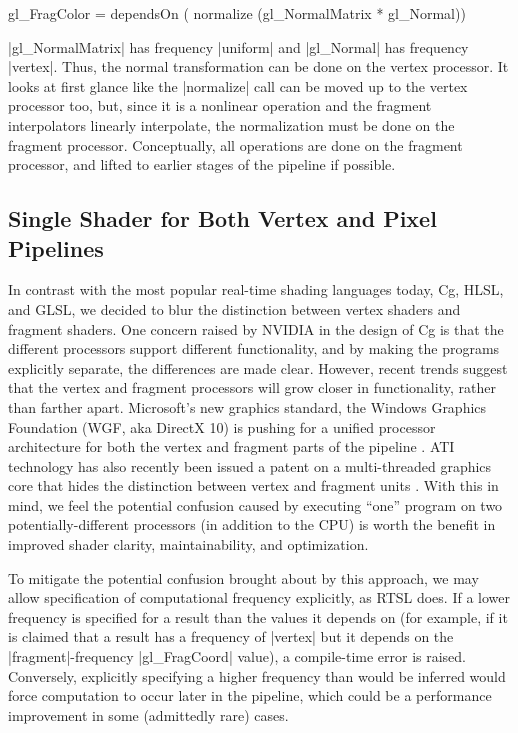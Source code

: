 \documentclass[review]{acmsiggraph}      %
\begin{document}
\begin{MyVerb}
gl_FragColor = dependsOn (
    normalize (gl_NormalMatrix * gl_Normal))
\end{MyVerb}

|gl_NormalMatrix| has frequency |uniform| and |gl_Normal| has
frequency |vertex|.  Thus, the normal transformation can be done on
the vertex processor.  It looks at first glance like the |normalize|
call can be moved up to the vertex processor too, but, since it is a
nonlinear operation and the fragment interpolators linearly
interpolate, the normalization must be done on the fragment processor.
Conceptually, all operations are done on the fragment processor, and
lifted to earlier stages of the pipeline if possible.


\subsection{Single Shader for Both Vertex and Pixel Pipelines}

In contrast with the most popular real-time shading languages today,
Cg, HLSL, and GLSL, we decided to blur the distinction between vertex
shaders and fragment shaders.  One concern raised by NVIDIA in the
design of Cg is that the different processors support different
functionality, and by making the programs explicitly separate, the
differences are made clear\cite{mark03cg}.  However, recent trends
suggest that the vertex and fragment processors will grow closer in
functionality, rather than farther apart. Microsoft's new graphics
standard, the Windows Graphics Foundation (WGF, aka DirectX 10) is
pushing for a unified processor architecture for both the vertex and
fragment parts of the pipeline \cite{blythewgf}. ATI technology has
also recently been issued a patent on a multi-threaded graphics core
that hides the distinction between vertex and fragment units
\cite{atimtpatent,b3datimtpatent}. With this in mind, we feel the
potential confusion caused by executing ``one'' program on two
potentially-different processors (in addition to the CPU) is worth the
benefit in improved shader clarity, maintainability, and optimization.

To mitigate the potential confusion brought about by this approach, we
may allow specification of computational frequency explicitly, as RTSL
does.  If a lower frequency is specified for a result than the values
it depends on (for example, if it is claimed that a result has a
frequency of |vertex| but it depends on the |fragment|-frequency
|gl_FragCoord| value), a compile-time error is raised.  Conversely,
explicitly specifying a higher frequency than would be inferred would
force computation to occur later in the pipeline, which could be a
performance improvement in some (admittedly rare) cases.
\end{document}
